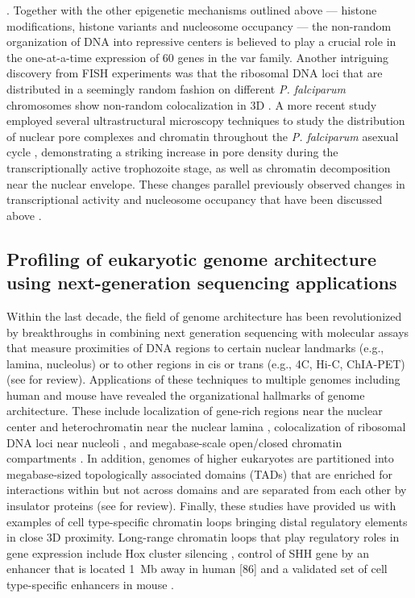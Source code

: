 \citep{lopez-rubio:genome-wide, freitas-junior:frequent, ralph:antigenic}.
Together with the other epigenetic mechanisms outlined above —
histone modifications, histone variants and nucleosome occupancy — the
non-random organization of DNA into repressive centers is believed to play a
crucial role in the one-at-a-time expression of 60 genes in the var family.
Another intriguing discovery from FISH experiments was that the ribosomal DNA
loci that are distributed in a seemingly random fashion on different \textit{P.
falciparum} chromosomes show non-random colocalization in 3D
\citep{mancio-silva:clustering}. A more
recent study employed several ultrastructural microscopy techniques to study
the distribution of nuclear pore complexes and chromatin throughout the
\textit{P.
falciparum} asexual cycle \citep{weiner:3d}, demonstrating a striking increase in pore
density during the transcriptionally active trophozoite stage, as well as
chromatin decomposition near the nuclear envelope. These changes parallel
previously observed changes in transcriptional activity and nucleosome
occupancy that have been discussed above \citep{ponts:nucleosome}.

\subsection{Profiling of eukaryotic genome architecture using next-generation
sequencing applications}

Within the last decade, the field of genome architecture has been
revolutionized by breakthroughs in combining next generation sequencing with
molecular assays that measure proximities of DNA regions to certain nuclear
landmarks (e.g., lamina, nucleolus) or to other regions in cis or trans (e.g.,
4C, Hi-C, ChIA-PET) \citep{duan:three-dimensional,
lieberman-aiden:comprehensive, fullwood:oestrogen-receptor-alpha-bound,
guelen:domain, koningsbruggen:high-resolution, vogel:detection,
zhao:circular} (see \citep{steensel:genomics} for review).
Applications of these
techniques to multiple genomes including human and mouse have revealed the
organizational hallmarks of genome architecture. These include localization of
gene-rich regions near the nuclear center and heterochromatin near the nuclear
lamina \citep{guelen:domain}, colocalization of ribosomal DNA loci near
nucleoli \citep{koningsbruggen:high-resolution}, and
megabase-scale open/closed chromatin compartments
\citep{lieberman-aiden:comprehensive}. In addition, genomes
of higher eukaryotes are partitioned into megabase-sized topologically
associated domains (TADs) that are enriched for interactions within but not
across domains and are separated from each other by insulator proteins
\citep{dixon:topological, nora:spatial, sofueva:cohesin-mediated}
(see \citep{nora:segmental} 
for review). Finally, these studies have provided us with
examples of cell type-specific chromatin loops bringing distal regulatory
elements in close 3D proximity. Long-range chromatin loops that play
regulatory roles in gene expression include Hox cluster silencing
\citep{ferraiuolo:three-dimensional, rousseau:hox},
control of SHH gene by an enhancer that is located 1~Mb away in human
\citep{li:extensive} [86] and
a validated set of cell type-specific enhancers in mouse \citep{shen:map}.

